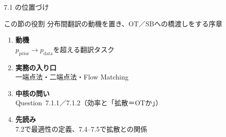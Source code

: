 \asmain
\begin{frame}{7.1 の位置づけ}
    \begin{block}{この節の役割}
        分布間翻訳の動機を置き、OT／SBへの橋渡しをする序章
    \end{block}
    \begin{enumerate}
        \item \textbf{動機}\\
        $p_{\mathrm{prior}}\to p_{\mathrm{data}}$を超える翻訳タスク
        \item \textbf{実務の入り口}\\
        一端点法・二端点法・Flow Matching
        \item \textbf{中核の問い}\\
        Question~7.1.1／7.1.2（効率と「拡散＝OTか」）
        \item \textbf{先読み}\\
        7.2で最適性の定義、7.4--7.5で拡散との関係
    \end{enumerate}
\end{frame}
